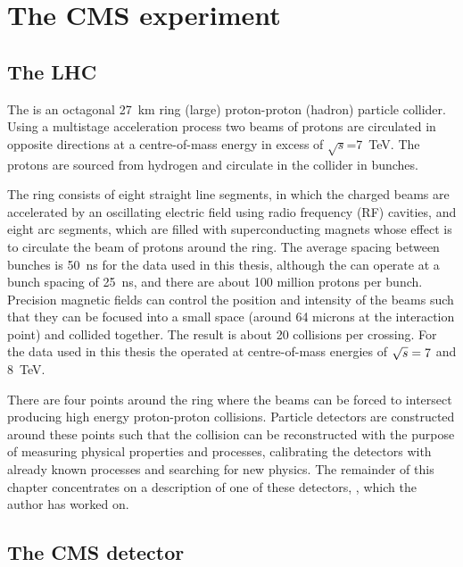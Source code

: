 \chapter{The CMS experiment}
\label{chap:cms}

\section{The LHC}

The \LHC is an octagonal 27~km ring (large) proton-proton (hadron) particle collider. Using a multistage acceleration process two beams of protons are circulated in opposite directions at a centre-of-mass energy in excess of $\sqrt{s}$=7~TeV. The protons are sourced from hydrogen and circulate in the collider in bunches.  


The \LHC ring consists of eight straight line segments, in which the charged beams are accelerated by an oscillating electric field using radio frequency (RF) cavities, and eight arc segments, which are filled with superconducting magnets whose effect is to circulate the beam of protons around the ring. The average spacing between bunches is 50~ns for the data used in this thesis, although the \LHC can operate at a bunch spacing of 25~ns, and there are about 100 million protons per bunch. Precision magnetic fields can control the position and intensity of the beams such that they can be focused into a small space (around 64 microns at the interaction point) and collided together. The result is about 20 collisions per crossing. For the data used in this thesis the \LHC operated at centre-of-mass energies of $\sqrt{s}=7$ and 8~TeV. 

There are four points around the ring where the beams can be forced to intersect producing high energy proton-proton collisions. Particle detectors are constructed around these points such that the collision can be reconstructed with the purpose of measuring physical properties and processes, calibrating the detectors with already known processes and searching for new physics. The remainder of this chapter concentrates on a description of one of these detectors, \CMS, which the author has worked on.

\section{The CMS detector}

